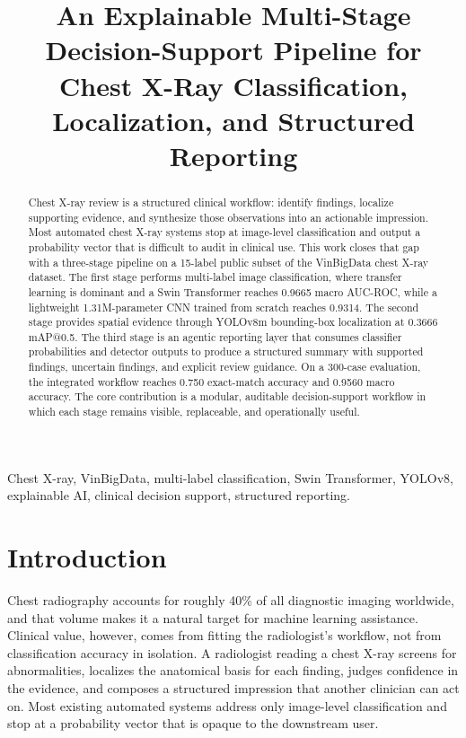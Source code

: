 \documentclass[conference]{IEEEtran}
\begin{document}
\title{An Explainable Multi-Stage Decision-Support Pipeline for Chest X-Ray Classification, Localization, and Structured Reporting}

\author{
}

\maketitle

\begin{abstract}
Chest X-ray review is a structured clinical workflow: identify findings, localize supporting evidence, and synthesize those observations into an actionable impression. Most automated chest X-ray systems stop at image-level classification and output a probability vector that is difficult to audit in clinical use. This work closes that gap with a three-stage pipeline on a 15-label public subset of the VinBigData chest X-ray dataset. The first stage performs multi-label image classification, where transfer learning is dominant and a Swin Transformer reaches 0.9665 macro AUC-ROC, while a lightweight 1.31M-parameter CNN trained from scratch reaches 0.9314. The second stage provides spatial evidence through YOLOv8m bounding-box localization at 0.3666 mAP@0.5. The third stage is an agentic reporting layer that consumes classifier probabilities and detector outputs to produce a structured summary with supported findings, uncertain findings, and explicit review guidance. On a 300-case evaluation, the integrated workflow reaches 0.750 exact-match accuracy and 0.9560 macro accuracy. The core contribution is a modular, auditable decision-support workflow in which each stage remains visible, replaceable, and operationally useful.
\end{abstract}

\begin{IEEEkeywords}
Chest X-ray, VinBigData, multi-label classification, Swin Transformer, YOLOv8, explainable AI, clinical decision support, structured reporting.
\end{IEEEkeywords}

\section{Introduction}
Chest radiography accounts for roughly 40\% of all diagnostic imaging worldwide, and that volume makes it a natural target for machine learning assistance. Clinical value, however, comes from fitting the radiologist's workflow, not from classification accuracy in isolation. A radiologist reading a chest X-ray screens for abnormalities, localizes the anatomical basis for each finding, judges confidence in the evidence, and composes a structured impression that another clinician can act on. Most existing automated systems address only image-level classification and stop at a probability vector that is opaque to the downstream user.
\end{document}
